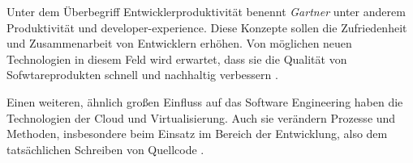 Unter dem Überbegriff Entwicklerproduktivität benennt \textit{Gartner} unter anderem Produktivität und \Gls{developer-experience}. Diese Konzepte sollen die Zufriedenheit und Zusammenarbeit von Entwicklern erhöhen. Von möglichen neuen Technologien in diesem Feld wird erwartet, dass sie die Qualität von Sofwtareprodukten schnell und nachhaltig verbessern \cite{107:Spotlight-on-2024-Gartner-Hype-Cycle-for-Emerging-Technologies}.

Einen weiteren, ähnlich großen Einfluss auf das Software Engineering haben die Technologien der Cloud und Virtualisierung. Auch sie verändern Prozesse und Methoden, insbesondere beim Einsatz im Bereich der Entwicklung, also dem tatsächlichen Schreiben von Quellcode \cite{014:Managing-Container-based-Software-Development-Environments}.
